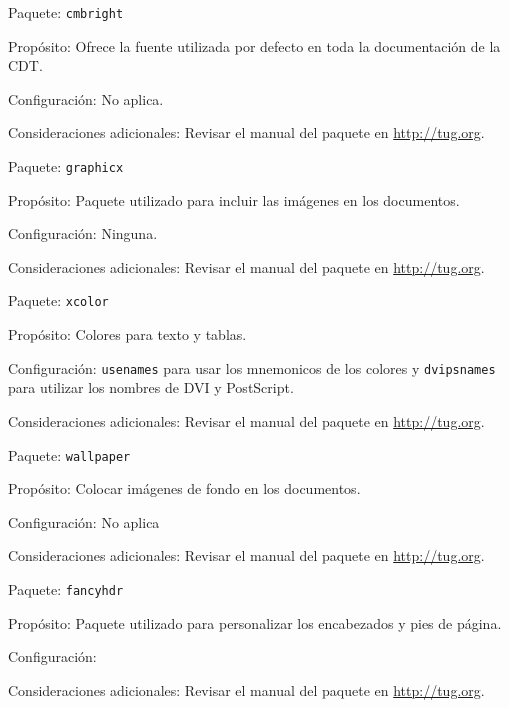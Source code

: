 \begin{Cdescription}
	\item[Paquete:] {\tt cmbright}
	\item[Propósito:] Ofrece la fuente utilizada por defecto en toda la documentación de la CDT.
	\item[Configuración:] No aplica.
	\item[Consideraciones adicionales:] Revisar el manual del paquete en \url{http://tug.org}.
\end{Cdescription}

\begin{Cdescription}
	\item[Paquete:] {\tt graphicx}
	\item[Propósito:] Paquete utilizado para incluir las imágenes en los documentos.
	\item[Configuración:] Ninguna.
	\item[Consideraciones adicionales:] Revisar el manual del paquete en \url{http://tug.org}.
\end{Cdescription}

\begin{Cdescription}
	\item[Paquete:] {\tt xcolor}
	\item[Propósito:] Colores para texto y tablas.
	\item[Configuración:] {\tt usenames} para usar los mnemonicos de los colores y {\tt dvipsnames} para utilizar los nombres de DVI y PostScript.
	\item[Consideraciones adicionales:] Revisar el manual del paquete en \url{http://tug.org}.
\end{Cdescription}

\begin{Cdescription}
	\item[Paquete:] {\tt wallpaper}
	\item[Propósito:] Colocar imágenes de fondo en los documentos.
	\item[Configuración:] No aplica
	\item[Consideraciones adicionales:] Revisar el manual del paquete en \url{http://tug.org}.
\end{Cdescription}

\begin{Cdescription}
	\item[Paquete:] {\tt fancyhdr}%
	\item[Propósito:] Paquete utilizado para personalizar los encabezados y pies de página.
	\item[Configuración:]
	\item[Consideraciones adicionales:]Revisar el manual del paquete en \url{http://tug.org}.
\end{Cdescription}

